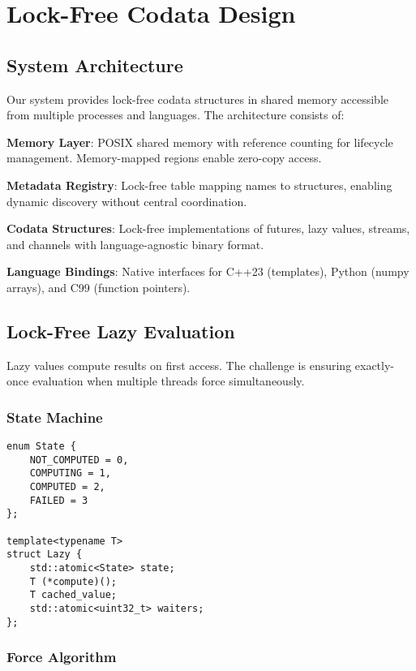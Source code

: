 \documentclass[sigconf,review,anonymous]{acmart}
\begin{document}
\section{Lock-Free Codata Design}

\subsection{System Architecture}

Our system provides lock-free codata structures in shared memory accessible from multiple processes and languages. The architecture consists of:

\textbf{Memory Layer}: POSIX shared memory with reference counting for lifecycle management. Memory-mapped regions enable zero-copy access.

\textbf{Metadata Registry}: Lock-free table mapping names to structures, enabling dynamic discovery without central coordination.

\textbf{Codata Structures}: Lock-free implementations of futures, lazy values, streams, and channels with language-agnostic binary format.

\textbf{Language Bindings}: Native interfaces for C++23 (templates), Python (numpy arrays), and C99 (function pointers).

\subsection{Lock-Free Lazy Evaluation}

Lazy values compute results on first access. The challenge is ensuring exactly-once evaluation when multiple threads force simultaneously.

\subsubsection{State Machine}

\begin{lstlisting}
enum State { 
    NOT_COMPUTED = 0,
    COMPUTING = 1, 
    COMPUTED = 2,
    FAILED = 3
};

template<typename T>
struct Lazy {
    std::atomic<State> state;
    T (*compute)();
    T cached_value;
    std::atomic<uint32_t> waiters;
};
\end{lstlisting}

\subsubsection{Force Algorithm}
\end{document}
